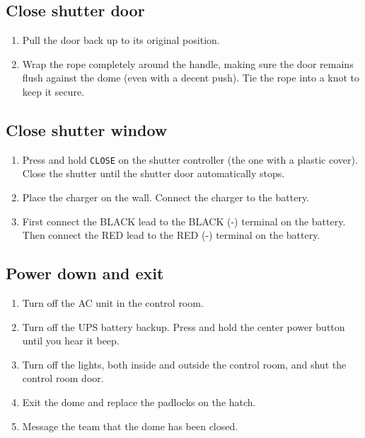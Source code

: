 \documentclass{article}
\begin{document}
	\subsection{Close shutter door}
	\label{sec:close-shutter-door}
	
	\begin{enumerate}
		
		\item Pull the door back up to its original position.
		
		\item Wrap the rope completely around the handle, making sure the door remains flush against the dome (even with a decent push). Tie the rope into a knot to keep it secure.
		
	\end{enumerate}
	
	\subsection{Close shutter window}
	\label{sec:close-shutter-window}
	
	\begin{enumerate}
		
		\item Press and hold \texttt{CLOSE} on the shutter controller (the one with a plastic cover). Close the shutter until the shutter door automatically stops.

		\item Place the charger on the wall. Connect the charger to the battery.
		
		\item First connect the BLACK lead to the BLACK (-) terminal on the battery. Then connect the RED lead to the RED (-) terminal on the battery.
		
	\end{enumerate}
	
	\subsection{Power down and exit}
	\label{sec:power-down-and-exit}
	
	\begin{enumerate}
		
		\item Turn off the AC unit in the control room.
		
		\item Turn off the UPS battery backup. Press and hold the center power button until you hear it beep.
		
		\item Turn off the lights, both inside and outside the control room, and shut the control room door.
		
		\item Exit the dome and replace the padlocks on the hatch.
		
		\item Message the team that the dome has been closed.
		
	\end{enumerate}
\end{document}
